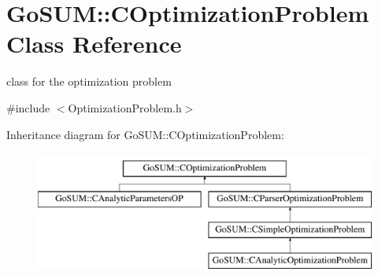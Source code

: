 \hypertarget{class_go_s_u_m_1_1_c_optimization_problem}{\section{Go\-S\-U\-M\-:\-:C\-Optimization\-Problem Class Reference}
\label{class_go_s_u_m_1_1_c_optimization_problem}
}


class for the optimization problem  




{\ttfamily \#include $<$Optimization\-Problem.\-h$>$}

Inheritance diagram for Go\-S\-U\-M\-:\-:C\-Optimization\-Problem\-:\begin{figure}[H]
\begin{center}
\leavevmode
\includegraphics[height=4.000000cm]{class_go_s_u_m_1_1_c_optimization_problem}
\end{center}
\end{figure}
